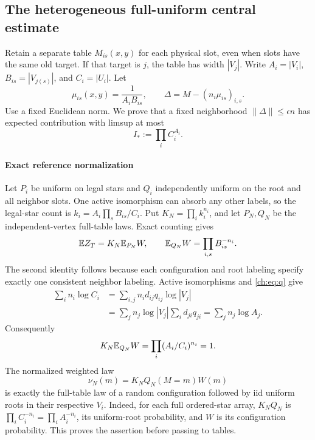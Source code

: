 \subsection{The heterogeneous full-uniform central estimate}
Retain a separate table $M_{is}(x,y)$ for each physical slot, even when slots have the same old target. If that target is $j$, the table has width $|V_j|$. Write $A_i=|V_i|$, $B_{is}=|V_{j(s)}|$, and $C_i=|U_i|$. Let
\[
 \mu_{is}(x,y)=\frac1{A_iB_{is}},\qquad
 \Delta=M-(n_i\mu_{is})_{i,s}.
\]
Use a fixed Euclidean norm. We prove that a fixed neighborhood $\|\Delta\|\le\epsilon n$ has expected contribution with limsup at most
\begin{equation}\label{ch:eq:index}
 I_*:=\prod_i C_i^{A_i}.
\end{equation}

\paragraph{Exact reference normalization}
Let $P_i$ be uniform on legal stars and $Q_i$ independently uniform on the root and all neighbor slots. One active isomorphism can absorb any other labels, so the legal-star count is $k_i=A_i\prod_sB_{is}/C_i$. Put $K_N=\prod_i k_i^{n_i}$, and let $P_N,Q_N$ be the independent-vertex full-table laws. Exact counting gives
\begin{equation}\label{ch:eq:normalizers}
 \mathbb E Z_T=K_N\mathbb E_{P_N}W,\qquad
 \mathbb E_{Q_N}W=\prod_{i,s}B_{is}^{-n_i}.
\end{equation}
The second identity follows because each configuration and root labeling specify exactly one consistent neighbor labeling. Active isomorphisms and \eqref{ch:eq:q} give
\begin{align*}
 \sum_i n_i\log C_i
 &=\sum_{i,j}n_id_{ij}q_{ij}\log|V_j|\\
 &=\sum_jn_j\log|V_j|\sum_i d_{ji}q_{ji}
 =\sum_jn_j\log A_j.
\end{align*}
Consequently
\begin{equation}\label{ch:eq:exactone}
 K_N\mathbb E_{Q_N}W=\prod_i(A_i/C_i)^{n_i}=1.
\end{equation}
The normalized weighted law
\[
 \nu_N(m)=K_NQ_N(M=m)W(m)
\]
is exactly the full-table law of a random configuration followed by iid uniform roots in their respective $V_i$. Indeed, for each full ordered-star array, $K_NQ_N$ is $\prod_i C_i^{-n_i}=\prod_i A_i^{-n_i}$, its uniform-root probability, and $W$ is its configuration probability. This proves the assertion before passing to tables.


